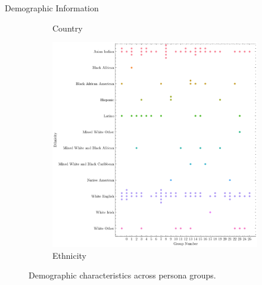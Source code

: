 \begin{frame}{Demographic Information}
\begin{figure}
\begin{subfigure}{.3\textwidth}
  \caption{Country}
  \label{fig:persona_country}
\end{subfigure}
\begin{subfigure}{.3\textwidth}
  \centering
  \includegraphics[width=.8\linewidth]{Images/Ethnicity.pdf}
  \caption{Ethnicity}
  \label{fig:persona_ethnicity}
\end{subfigure}
\caption{Demographic characteristics across persona groups.}
\label{fig:persona_demographic_survey}
\end{figure}

\end{frame}